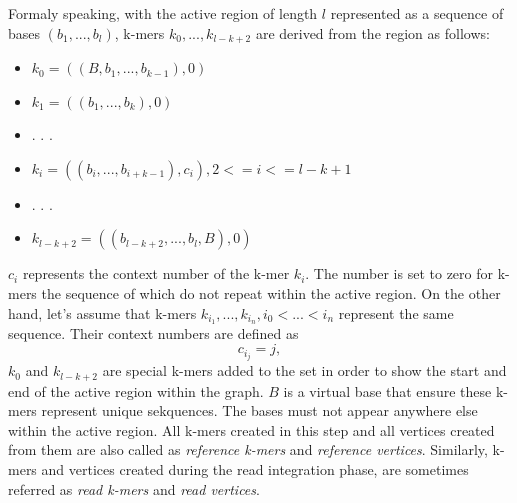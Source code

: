 Formaly speaking, with the active region of length $l$ represented as a sequence of bases $(b_1, ..., b_{l})$, k-mers $k_0, ..., k_{l-k+2}$ are derived from the region as follows:
\begin{itemize}
\item $k_0 = ((B, b_1, ..., b_{k-1}), 0)$
\item $k_1 = ((b_1, ..., b_k), 0)$
\item . . .
\item $k_i = ((b_i, ..., b_{i+k-1}), c_i), 2 <= i <=  l-k+1$
\item . . .
\item $k_{l-k+2} = ((b_{l-k+2}, ..., b_l, B), 0)$
\end{itemize}
$c_i$ represents the context number of the k-mer $k_i$. The number is set to zero for k-mers the sequence of which do not repeat within the active region. On the other hand, let's assume that k-mers $k_{i_1}, ..., k_{i_n}, i_0 < ... < i_n$ represent the same sequence. Their context numbers are defined as
$$
c_{i_j} = j, 
$$
$k_0$ and $k_{l-k+2}$ are special k-mers added to the set in order to show the start and end of the active region within the graph. $B$ is a virtual base that ensure these k-mers represent unique sekquences. The bases must not appear anywhere else within the active region. All k-mers created in this step and all vertices created from them are also called as \textit{reference k-mers} and \textit{reference vertices}. Similarly, k-mers and vertices created during the read integration phase, are sometimes referred as \textit{read k-mers} and \textit{read vertices}.

